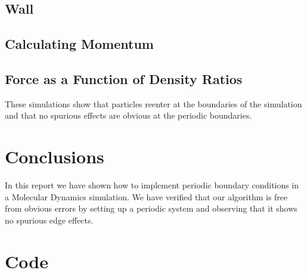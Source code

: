 \documentclass{article}
\begin{document}
\subsection{Wall}
\subsection{Calculating Momentum}
\subsection{Force as a Function of Density Ratios}



These simulations show that particles reenter at the boundaries of the simulation and that no spurious effects are obvious at the periodic boundaries.

\section{Conclusions}
In this report we have shown how to implement periodic boundary conditions in a Molecular Dynamics simulation. We have verified that our algorithm is free from obvious errors by setting up a periodic system and observing that it shows no spurious edge effects.


\appendix
\section{Code}

\end{document}
